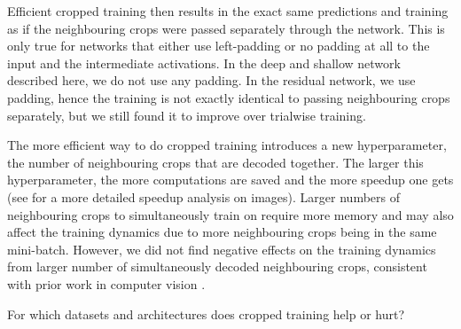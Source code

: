     Efficient cropped training then results in the exact same predictions
and training as if the neighbouring crops were passed separately through
the network. This is only true for networks that either use left-padding
or no padding at all to the input and the intermediate activations. In
the deep and shallow network described here, we do not use any padding.
In the residual network, we use padding, hence the training is not
exactly identical to passing neighbouring crops separately, but we still
found it to improve over trialwise training.

    The more efficient way to do cropped training introduces a new
hyperparameter, the number of neighbouring crops that are decoded
together. The larger this hyperparameter, the more computations are
saved and the more speedup one gets (see
\citet{giusti_fast_2013} for a more detailed speedup analysis
on images). Larger numbers of neighbouring crops to simultaneously train
on require more memory and may also affect the training dynamics due to
more neighbouring crops being in the same mini-batch. However, we did
not find negative effects on the training dynamics from larger number of
simultaneously decoded neighbouring crops, consistent with prior work in
computer vision \citep{shelhamer_fully_2016}.

\begin{openbox}
\item For which datasets and architectures does cropped training help or hurt? 
\end{openbox}
